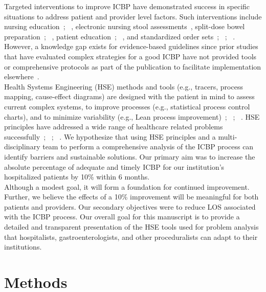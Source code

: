 \documentclass[Bprep]{subfiles}
\begin{document}
Targeted interventions to improve ICBP have demonstrated success in specific situations to address patient and provider level factors. Such interventions include nursing education~\cite{Rosenfeld2010-kx}; ~\cite{Lee2015-iw}, electronic nursing stool assessments~\cite{Yadlapati2018-kg}, split-dose bowel preparation~\cite{Yadlapati2018-kg}; ~\cite{Argyropoulos2018-cg}, patient education~\cite{Chambers2016-al}; ~\cite{Ergen2014-ve}, and standardized order sets~\cite{Yadlapati2018-kg}; ~\cite{Argyropoulos2018-cg}; ~\cite{Yang2014-ya}. However, a knowledge gap exists for evidence-based guidelines since prior studies that have evaluated complex strategies for a good ICBP have not provided tools or comprehensive protocols as part of the publication to facilitate implementation elsewhere~\cite{Yadlapati2018-kg}.\\

Health Systems Engineering (HSE) methods and tools (e.g., tracers, process mapping, cause-effect diagrams) are designed with the patient in mind to assess current complex systems, to improve processes (e.g., statistical process control charts), and to minimize variability (e.g., Lean process improvement)~\cite{Harry2010-ty}; ~\cite{Barnes2021-xy}; ~\cite{Ross2014-da}. HSE principles have addressed a wide range of healthcare related problems successfully~\cite{Watts2013-xv}; ~\cite{Das2018-jo}; ~\cite{Silva2010-so}. We hypothesize that using HSE principles and a multi-disciplinary team to perform a comprehensive analysis of the ICBP process can identify barriers and sustainable solutions. Our primary aim was to increase the absolute percentage of adequate and timely ICBP for our institution's hospitalized patients by 10\% within 6 months.\\

Although a modest goal, it will form a foundation for continued improvement. Further, we believe the effects of a 10\% improvement will be meaningful for both patients and providers. Our secondary objectives were to reduce LOS associated with the ICBP process. Our overall goal for this manuscript is to provide a detailed and transparent presentation of the HSE tools used for problem analysis that hospitalists, gastroenterologists, and other proceduralists can adapt to their institutions.


\hypertarget{Methods}{}
\section{Methods}
\hypertarget{Context}{}
\end{document}
